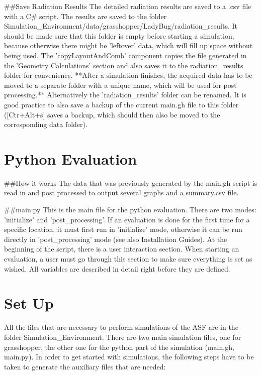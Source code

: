 	##Save Radiation Results
	The detailed radiation results are saved to a .csv file with a C# script. The results are saved to the folder Simulation_Environment/data/grasshopper/LadyBug/radiation_results. It should be made sure that this folder is empty before starting a simulation, because otherwise there might be 'leftover' data, which will fill up space without being used. The 'copyLayoutAndComb' component copies the file generated in the 'Geometry Calculations' section and also saves it to the radiation_results folder for convenience. **After a simulation finishes, the acquired data has to be moved to a separate folder with a unique name, which will be used for post processing.** Alternatively the 'radiation_results' folder can be renamed. It is good practice to also save a backup of the current main.gh file to this folder ([Ctr+Alt+s] saves a backup, which should then also be moved to the corresponding data folder). 


\section{Python Evaluation}

	##How it works
	The data that was previously generated by the main.gh script is read in and post processed to output several graphs and a summary.csv file. 

	##main.py
	This is the main file for the python evaluation. There are two modes: 'initialize' and 'post_processing'. If an evaluation is done for the first time for a specific location, it must first run in 'initialize' mode, otherwise it can be run directly in 'post_processing' mode (see also Installation Guides). 
	At the beginning of the script, there is a user interaction section. When starting an evaluation, a user must go through this section to make sure everything is set as wished. All variables are described in detail right before they are defined. 

\section{Set Up}

	All the files that are necessary to perform simulations of the ASF are in the folder Simulation_Environment. There are two main simulation files, one for grasshopper, the other one for the python part of the simulation (main.gh, main.py). In order to get started with simulations, the following steps have to be taken to generate the auxiliary files that are needed:

